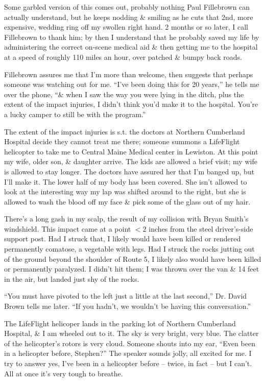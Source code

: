 \documentclass{article}
\numberwithin{equation}{section}
\begin{document}
Some garbled version of this comes out, probably nothing Paul Fillebrown can actually understand, but he keeps nodding \& smiling as he cuts that 2nd, more expensive, wedding ring off my swollen right hand. 2 months or so later, I call Fillebrown to thank him; by then I understand that he probably saved my life by administering the correct on-scene medical aid \& then getting me to the hospital at a speed of roughly 110 miles an hour, over patched \& bumpy back roads.

Fillebrown assures me that I'm more than welcome, then suggests that perhaps someone was watching out for me. ``I've been doing this for 20 years,'' he tells me over the phone, ``\& when I saw the way you were lying in the ditch, plus the extent of the impact injuries, I didn't think you'd make it to the hospital. You're a lucky camper to still be with the program.''

The extent of the impact injuries is s.t. the doctors at Northern Cumberland Hospital decide they cannot treat me there; someone summons a LifeFlight helicopter to take me to Central Maine Medical center in Lewiston. At this point my wife, older son, \& daughter arrive. The kids are allowed a brief visit; my wife is allowed to stay longer. The doctors have assured her that I'm banged up, but I'll make it. The lower half of my body has been covered. She isn't allowed to look at the interesting way my lap was shifted around to the right, but she is allowed to wash the blood off my face \& pick some of the glass out of my hair.

There's a long gash in my scalp, the result of my collision with Bryan Smith's windshield. This impact came at a point $< 2$ inches from the steel driver's-side support post. Had I struck that, I likely would have been killed or rendered permanently comatose, a vegetable with legs. Had I struck the rocks jutting out of the ground beyond the shoulder of Route 5, I likely also would have been killed or permanently paralyzed. I didn't hit them; I was thrown over the van \& 14 feet in the air, but landed just shy of the rocks.

``You must have pivoted to the left just a little at the last second,'' Dr. David Brown tells me later. ``If you hadn't, we wouldn't be having this conversation.''

The LifeFlight helicoper lands in the parking lot of Northern Cumberland Hospital, \& I am wheeled out to it. The sky is very bright, very blue. The clatter of the helicopter's rotors is very cloud. Someone shouts into my ear, ``Even been in a helicopter before, Stephen?'' The speaker sounds jolly, all excited for me. I try to answer yes, I've been in a helicopter before -- twice, in fact -- but I can't. All at once it's very tough to breathe.
\end{document}
